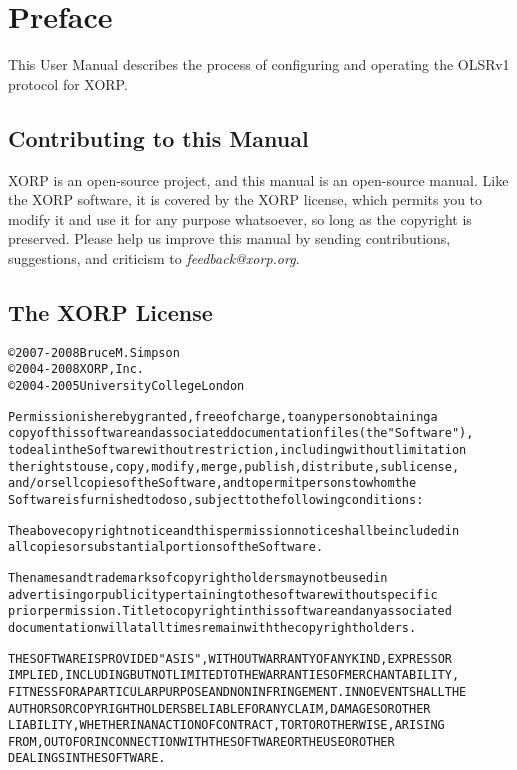 %
%

\chapter*{Preface}

\vspace{-0.1in}
This User Manual describes the process of configuring and operating
the OLSRv1 protocol for XORP.

\section*{Contributing to this Manual}
\vspace{-0.1in}
XORP is an open-source project, and this manual is an open-source
manual.  Like the XORP software, it is covered by the XORP license,
which permits you to modify it and use it for any purpose whatsoever,
so long as the copyright is preserved.  Please help us improve this
manual by sending contributions, suggestions, and criticism to {\it
  feedback@xorp.org}.

\section*{The XORP License}
\vspace{-0.3in}
\begin{alltt}
\small\noindent
\copyright 2007-2008 Bruce M. Simpson
\copyright 2004-2008 XORP, Inc.
\copyright 2004-2005 University College London

Permission is hereby granted, free of charge, to any person obtaining a
copy of this software and associated documentation files (the "Software"),
to deal in the Software without restriction, including without limitation
the rights to use, copy, modify, merge, publish, distribute, sublicense,
and/or sell copies of the Software, and to permit persons to whom the
Software is furnished to do so, subject to the following conditions:

The above copyright notice and this permission notice shall be included in
all copies or substantial portions of the Software.

The names and trademarks of copyright holders may not be used in
advertising or publicity pertaining to the software without specific
prior permission. Title to copyright in this software and any associated
documentation will at all times remain with the copyright holders.

THE SOFTWARE IS PROVIDED "AS IS", WITHOUT WARRANTY OF ANY KIND, EXPRESS OR
IMPLIED, INCLUDING BUT NOT LIMITED TO THE WARRANTIES OF MERCHANTABILITY,
FITNESS FOR A PARTICULAR PURPOSE AND NONINFRINGEMENT. IN NO EVENT SHALL THE
AUTHORS OR COPYRIGHT HOLDERS BE LIABLE FOR ANY CLAIM, DAMAGES OR OTHER
LIABILITY, WHETHER IN AN ACTION OF CONTRACT, TORT OR OTHERWISE, ARISING
FROM, OUT OF OR IN CONNECTION WITH THE SOFTWARE OR THE USE OR OTHER
DEALINGS IN THE SOFTWARE.
\end{alltt}

